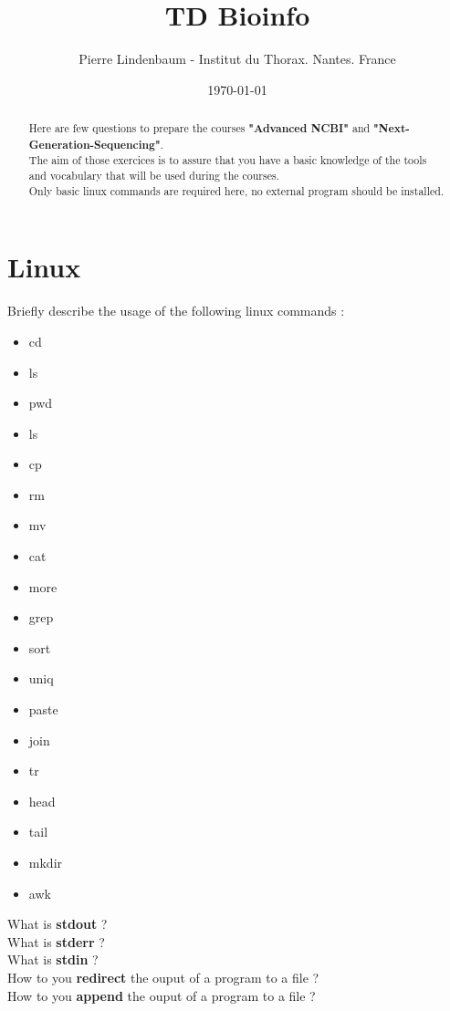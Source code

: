 \documentclass{article}
\title{TD Bioinfo}
\author{Pierre Lindenbaum - Institut du Thorax. Nantes. France}
\date{\today}
\begin{document}
\maketitle
\begin{abstract}
Here are few questions to prepare the courses 	\textbf{"Advanced NCBI"} and \textbf{"Next-Generation-Sequencing"}.\\
The aim of those exercices is to assure that you have a basic knowledge of the tools and vocabulary that will be used during the courses.\\
Only basic linux commands are required here, no external program should be installed.
\end{abstract}

\section{Linux}
Briefly describe the usage of the following linux commands :
\begin{itemize}
\item cd
\item ls
\item pwd
\item ls
\item cp
\item rm
\item mv
\item cat
\item more
\item grep
\item sort
\item uniq
\item paste
\item join
\item tr
\item head
\item tail
\item mkdir
\item awk
\end{itemize}
\noindent
What is 	\textbf{stdout} ? \\
What is 	\textbf{stderr} ?\\
What is 	\textbf{stdin} ?\\
How to you 	\textbf{redirect} the ouput of a program to a file ?\\
How to you 	\textbf{append} the ouput of a program to a file ?\\
\end{document}
